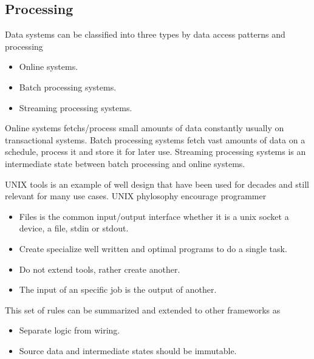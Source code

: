 \documentclass[../../main.tex]{subfiles}
\begin{document}
\subsection{Processing}
Data systems can be classified into three types by data access patterns and processing
\begin{itemize}
    \item Online systems.
    \item Batch processing systems.
    \item Streaming processing systems.
\end{itemize}
Online systems fetchs/process small amounts of data constantly usually on transactional
systems. Batch processing systems fetch vast amounts of data on a schedule, process it
and store it for later use. Streaming processing systems is an intermediate state
between batch processing and online systems.

UNIX tools is an example of well design that have been used for decades and still
relevant for many use cases. UNIX phylosophy encourage programmer
\begin{itemize}
    \item Files is the common input/output interface whether it is a unix socket
        a device, a file, stdin or stdout.
    \item Create specialize well written and optimal programs to do a single task.
    \item Do not extend tools, rather create another.
    \item The input of an specific job is the output of another.
\end{itemize}
This set of rules can be summarized and extended to other frameworks as
\begin{itemize}
    \item Separate logic from wiring.
    \item Source data and intermediate states should be immutable.
\end{itemize}
\end{document}
